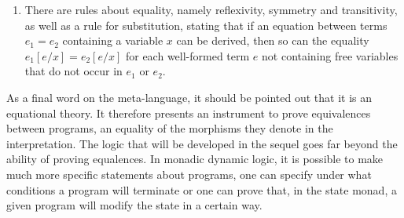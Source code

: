 \begin{enumerate}
\item There are rules about equality, namely reflexivity, symmetry and
  transitivity, as well as a rule for substitution, stating that if an
  equation between terms $e_1 = e_2$ containing a variable $x$ can be derived,
  then so can the equality $e_1[e/x] = e_2[e/x]$ for each well-formed term $e$
  not containing free variables that do not occur in $e_1$ or $e_2$.
\end{enumerate}


As a final word on the meta-language, it should be pointed out that it is an
equational theory. It therefore presents an instrument to prove equivalences
between programs, \IE an equality of the morphisms they denote in the
interpretation. The logic that will be developed in the sequel goes far beyond
the ability of proving equalences. In monadic dynamic logic, it is possible to
make much more specific statements about programs, \EG one can specify under
what conditions a program will terminate or one can prove that, in the state
monad, a given program will modify the state in a certain way.






